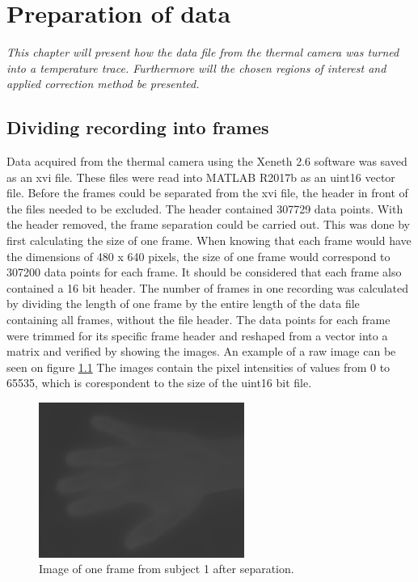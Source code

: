 \chapter{Preparation of data}

\textit{This chapter will present how the data file from the thermal camera was turned into a temperature trace. Furthermore will the chosen regions of interest and applied correction method be presented.}  

\section{Dividing recording into frames}

Data acquired from the thermal camera using the Xeneth 2.6 software was saved as an xvi file. These files were read into MATLAB R2017b as an uint16 vector file. Before the frames could be separated from the xvi file, the header in front of the files needed to be excluded. The header contained 307729 data points. With the header removed, the frame separation could be carried out. This was done by first calculating the size of one frame. When knowing that each frame would have the dimensions of 480 x 640 pixels, the size of one frame would correspond to 307200 data points for each frame. It should be considered that each frame also contained a 16 bit header. The number of frames in one recording was calculated by dividing the length of one frame by the entire length of the data file containing all frames, without the file header. The data points for each frame were trimmed for its specific frame header and reshaped from a vector into a matrix and verified by showing the images. An example of a raw image can be seen on figure \ref{fig:hand}
The images contain the pixel intensities of values from 0 to 65535, which is corespondent to the size of the uint16 bit file. 


\begin{figure}[H]
	\includegraphics[width=0.6\textwidth]{figures/uint16Hand}  %
	\caption{Image of one frame from subject 1 after separation.}
	\label{fig:hand}  %
\end{figure}